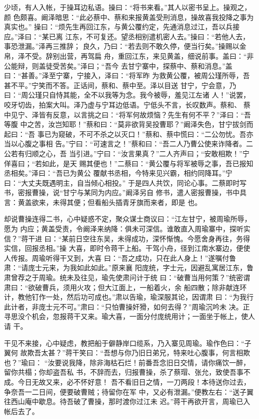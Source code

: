 少顷，有人入帐，于操耳边私语。操曰：“将书来看。”其人以密书呈上。操观之，颜
色颇喜。阚泽暗思：“此必蔡中、蔡和来报黄盖受刑消息，操故喜我投降之事为真实也。”
操曰：“烦先生再回江东，与黄公覆约定，先通消息过江，吾以兵接应。”泽曰：“某已离
江东，不可复还。望丞相别遣机密人去。”操曰：“若他人去，事恐泄漏。”泽再三推辞；
良久，乃曰：“若去则不敢久停，便当行矣。”操赐以金帛，泽不受。辞别出营，再驾扁
舟，重回江东，来见黄盖，细说前事。盖曰：“非公能辩，则盖徒受苦矣。”泽曰；“吾今
去甘宁寨中，探蔡中、蔡和消息。”盖曰：“甚善。”泽至宁寨，宁接入，泽曰：“将军昨
为救黄公覆，被周公瑾所辱，吾甚不平。”宁笑而不答。正话间，蔡和、蔡中至。泽以目送
甘宁，宁会意，乃曰：“周公瑾只自恃其能，全不以我等为念。我今被辱，羞见江左诸
人！”说罢，咬牙切齿，拍案大叫。泽乃虚与宁耳边低语。宁低头不言，长叹数声。蔡和、
蔡中见宁、泽皆有反意，以言挑之曰：“将军何故烦恼？先生有何不平？”泽曰：“吾等腹
中之苦，汝岂知耶！”蔡和曰：“莫非欲背吴投曹耶？”阚泽失色，甘宁拔剑而起曰：“吾
事已为窥破，不可不杀之以灭口！”蔡和、蔡中慌曰：“二公勿忧。吾亦当以心腹之事相
告。”宁曰：“可速言之！”蔡和曰：“吾二人乃曹公使来诈降者。二公若有归顺之心，吾
当引进。”宁曰：“汝言果真？”二人齐声曰；“安敢相欺！”宁佯喜曰；“若如此，是天
赐其便也！”二蔡曰：“黄公覆与将军被辱之事，吾已报知丞相矣。”泽曰：“吾已为黄公
覆献书丞相，今特来见兴霸，相约同降耳。”宁曰：“大丈夫既遇明主，自当倾心相投。”
于是四人共饮，同论心事。二蔡即时写书，密报曹操，说“甘宁与某同为内应。”阚泽另自
修书，遣人密报曹操，书中具言：黄盖欲来，未得其便；但看船头插青牙旗而来者，即是
也。

却说曹操连得二书，心中疑惑不定，聚众谋士商议曰：“江左甘宁，被周瑜所辱，愿为
内应；黄盖受责，令阚泽来纳降：俱未可深信。谁敢直入周瑜寨中，探听实信？”蒋干进
曰：“某前日空往东吴，未得成功，深怀惭愧。今愿舍身再往，务得实信，回报丞相。”操
大喜，即时令蒋干上船。干驾小舟，径到江南水寨边，便使人传报。周瑜听得干又到，大喜
曰：“吾之成功，只在此人身上！”遂嘱付鲁肃：“请庞士元来，为我如此如此。”原来襄
阳庞统，字士元，因避乱寓居江东，鲁肃曾荐之于周瑜。统未及往见，瑜先使肃问计于统
曰：“破曹当用何策？”统密谓肃曰：“欲破曹兵，须用火攻；但大江面上，一船着火，余
船四散；除非献连环计，教他钉作一处，然后功可成也。”肃以告瑜，瑜深服其论，因谓肃
曰：“为我行此计者，非庞士元不可。”肃曰：“只怕曹操奸猾，如何去得？”周瑜沉吟未
决。正寻思没个机会，忽报蒋干又来。瑜大喜，一面分付庞统用计；一面坐于帐上，使人请
干。

干见不来接，心中疑虑，教把船于僻静岸口缆系，乃入寨见周瑜。瑜作色曰：“子翼何
故欺吾太甚？”蒋干笑曰：“吾想与你乃旧日弟兄，特来吐心腹事，何言相欺也？”瑜曰：
“汝要说我降，除非海枯石烂！前番吾念旧日交情，请你痛饮一醉，留你共榻；你却盗吾私
书，不辞而去，归报曹操，杀了蔡瑁、张允，致使吾事不成。今日无故又来，必不怀好意！
吾不看旧日之情，一刀两段！本待送你过去，争奈吾一二日间，便要破曹贼；待留你在军
中，又必有泄漏。”便教左右：“送子翼往西山庵中歇息。待吾破了曹操，那时渡你过江未
迟。”蒋干再欲开言，周瑜已入帐后去了。

